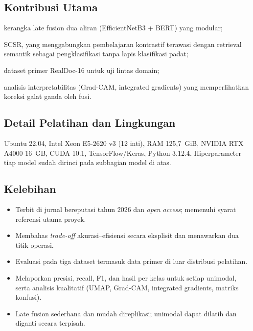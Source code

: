 \subsection{Kontribusi Utama}
\begin{enumerate*}[label=(\alph*)]
  \item kerangka late fusion dua aliran (EfficientNetB3 + BERT) yang modular;
  \item SCSR, yang menggabungkan pembelajaran kontrastif terawasi dengan retrieval
        semantik sebagai pengklasifikasi tanpa lapis klasifikasi padat;
  \item dataset primer RealDoc-16 untuk uji lintas domain;
  \item analisis interpretabilitas (Grad-CAM, integrated gradients) yang memperlihatkan
        koreksi galat ganda oleh fusi.
\end{enumerate*}

\subsection{Detail Pelatihan dan Lingkungan}
Ubuntu 22.04, Intel Xeon E5-2620 v3 (12 inti), RAM 125,7~GiB, NVIDIA RTX A4000 16~GB,
CUDA 10.1, TensorFlow/Keras, Python 3.12.4. Hiperparameter tiap model sudah dirinci pada
subbagian model di atas.

\subsection{Kelebihan}
\begin{itemize}
  \item Terbit di jurnal bereputasi tahun 2026 dan \emph{open access}; memenuhi syarat
        referensi utama proyek.
  \item Membahas \emph{trade-off} akurasi--efisiensi secara eksplisit dan menawarkan dua
        titik operasi.
  \item Evaluasi pada tiga dataset termasuk data primer di luar distribusi pelatihan.
  \item Melaporkan presisi, recall, F1, dan hasil per kelas untuk setiap unimodal, serta
        analisis kualitatif (UMAP, Grad-CAM, integrated gradients, matriks konfusi).
  \item Late fusion sederhana dan mudah direplikasi; unimodal dapat dilatih dan diganti
        secara terpisah.
\end{itemize}

